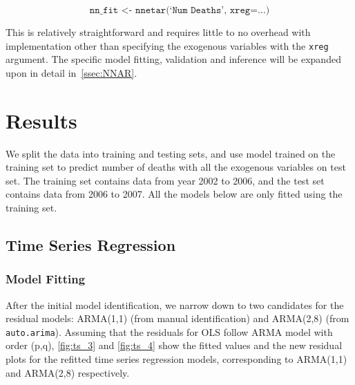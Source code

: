 \documentclass{article}\usepackage[]{graphicx}\usepackage[]{color}
\begin{document}
\begin{equation*}
    \texttt{nn\_fit <- nnetar(`Num Deaths', xreg=\ldots)}
\end{equation*}

This is relatively straightforward and requires little to no overhead with implementation other than specifying the exogenous variables with the \texttt{xreg} argument. The specific model fitting, validation and inference will be expanded upon in detail in~\autoref{ssec:NNAR}.

\section{Results} \label{s:results}
We split the data into training and testing sets, and use model trained on the training set to predict number of deaths with all the exogenous variables on test set. The training set contains data from year 2002 to 2006, and the test set contains data from 2006 to 2007. All the models below are only fitted using the training set.

\subsection{Time Series Regression} \label{ssec:ts_reg}
\subsubsection*{Model Fitting}

After the initial model identification, we narrow down to two candidates for the residual models: ARMA(1,1) (from manual identification) and ARMA(2,8) (from \texttt{auto.arima}). Assuming that the residuals for OLS follow ARMA model with order (p,q), \autoref{fig:ts_3} and \autoref{fig:ts_4} show the fitted values and the new residual plots for the refitted time series regression models, corresponding to ARMA(1,1) and ARMA(2,8) respectively.
\end{document}

